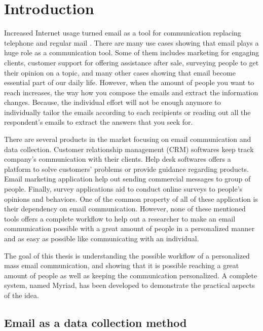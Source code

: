 \chapter{Introduction}
\label{chp:Intro}
Increased Internet usage turned email as a tool for communication replacing telephone and regular mail \cite{Norman2000,Madden2003}. There are many use cases showing that email plays a huge role as a communication tool. Some of them includes marketing for engaging clients, customer support for offering assistance after sale, surveying people to get their opinion on a topic, and many other cases showing that email become essential part of our daily life.
However, when the amount of people you want to reach increases, the way how you compose the emails and extract the information changes. Because, the individual effort will not be enough anymore to individually tailor the emails according to each recipients or reading out all the respondent's emails to extract the answers that you seek for.
\vspace{1cm}

There are several products in the market focusing on email communication and data collection. Customer relationship management (CRM) softwares keep track company's communication with their clients. Help desk softwares offers a platform to solve customers' problems or provide guidance regarding products. Email marketing application help out sending commercial messages to group of people. Finally, survey applications aid to conduct online surveys to people's opinions and behaviors. One of the common property of all of these application is their dependency on email communication. However, none of these mentioned tools offers a complete workflow to help out a researcher to make an email communication possible with a great amount of people in a personalized manner and as easy as possible like communicating with an individual.
\vspace{1cm}

The goal of this thesis is understanding the possible workflow of a personalized mass email communication, and showing that it is possible reaching a great amount of people as well as keeping the communication personalized. A complete system, named Myriad, has been developed to demonstrate the practical aspects of the idea.

\section{Email as a data collection method}
\label{sec:1:EmailDataCol}

